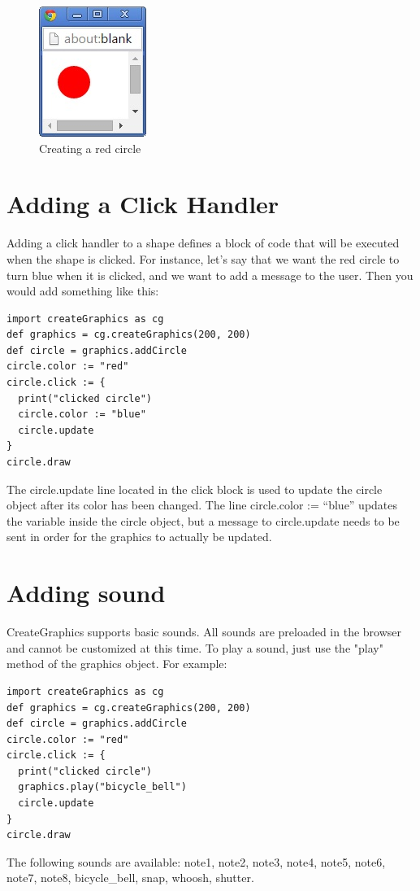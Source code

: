 \documentclass{article}
\begin{document}
\begin{figure}[h]
\includegraphics{red_circle}
\centering
\caption{Creating a red circle}
\label{fig:red_circle}
\end{figure}

\section{Adding a Click Handler}
Adding a click handler to a shape defines a block of code that will be executed when the shape is clicked. For instance,
let's say that we want the red circle to turn blue when it is clicked, and we want to add a message to the user. 
Then you would add something like this:
\begin{lstlisting}
import createGraphics as cg
def graphics = cg.createGraphics(200, 200)
def circle = graphics.addCircle
circle.color := "red"
circle.click := { 
  print("clicked circle") 
  circle.color := "blue"
  circle.update
}
circle.draw
\end{lstlisting}
The \color{blue} circle.update \color{black} line located in the click block is used to update the circle object after its color
has been changed. The line \color{blue}circle.color := ``blue'' \color{black} updates the variable inside the circle object, but
a message to circle.update needs to be sent in order for the graphics to actually be updated.

\section{Adding sound}
CreateGraphics supports basic sounds. All sounds are preloaded in the browser and cannot be customized at this time.
To play a sound, just use the "play" method of the graphics object. For example:
\begin{lstlisting}
import createGraphics as cg
def graphics = cg.createGraphics(200, 200)
def circle = graphics.addCircle
circle.color := "red"
circle.click := { 
  print("clicked circle") 
  graphics.play("bicycle_bell")
  circle.update
}
circle.draw
\end{lstlisting}


The following sounds are available: note1, note2, note3, note4, note5, note6, note7, note8, bicycle\_bell, snap, 
whoosh, shutter.
\end{document}
